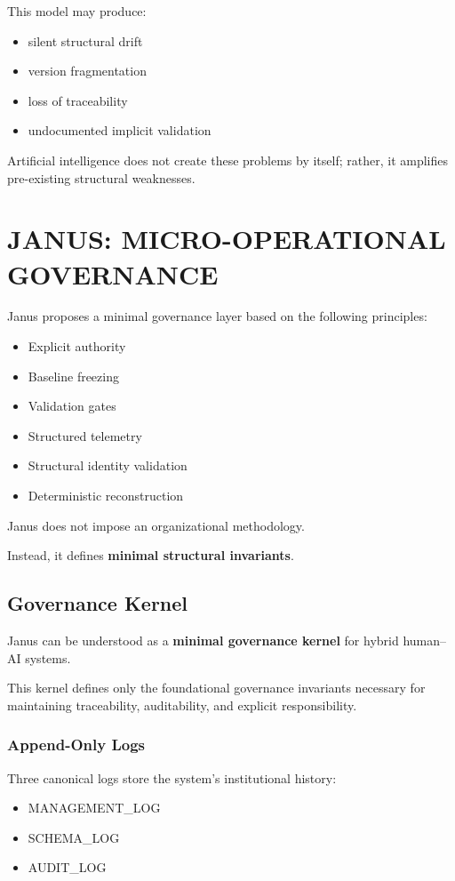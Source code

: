 \documentclass[conference]{IEEEtran}
\begin{document}
This model may produce:
\begin{itemize}
  \item silent structural drift
  \item version fragmentation
  \item loss of traceability
  \item undocumented implicit validation
\end{itemize}

Artificial intelligence does not create these problems by itself; rather, it amplifies pre-existing structural weaknesses.

\section{JANUS: MICRO-OPERATIONAL GOVERNANCE}
Janus proposes a minimal governance layer based on the following principles:
\begin{itemize}
  \item Explicit authority
  \item Baseline freezing
  \item Validation gates
  \item Structured telemetry
  \item Structural identity validation
  \item Deterministic reconstruction
\end{itemize}

Janus does not impose an organizational methodology.

Instead, it defines \textbf{minimal structural invariants}.

\subsection{Governance Kernel}
Janus can be understood as a \textbf{minimal governance kernel} for hybrid human--AI systems.

This kernel defines only the foundational governance invariants necessary for maintaining traceability, auditability, and explicit responsibility.

\subsubsection{Append-Only Logs}
Three canonical logs store the system’s institutional history:
\begin{itemize}
  \item MANAGEMENT\_LOG
  \item SCHEMA\_LOG
  \item AUDIT\_LOG
\end{itemize}
\end{document}
